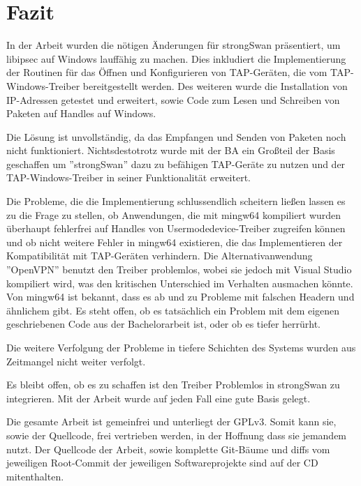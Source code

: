 



\section{Fazit}

In der Arbeit wurden die nötigen Änderungen für strongSwan präsentiert, um
libipsec auf Windows lauffähig zu machen. Dies inkludiert die Implementierung
der Routinen für das Öffnen und Konfigurieren von TAP-Geräten, die vom TAP-Windows-Treiber
bereitgestellt werden. Des weiteren wurde die Installation von IP-Adressen getestet
und erweitert, sowie Code zum Lesen und Schreiben von Paketen auf Handles auf Windows.

Die Lösung ist unvollständig, da das Empfangen und Senden von Paketen noch nicht funktioniert.
Nichtsdestotrotz wurde mit der \ac{BA} ein Großteil der Basis geschaffen um ''strongSwan''
dazu zu befähigen TAP-Geräte zu nutzen und der TAP-Windows-Treiber in seiner Funktionalität
erweitert.

Die Probleme, die die Implementierung schlussendlich scheitern ließen lassen es zu
die Frage zu stellen, ob Anwendungen, die mit mingw64 kompiliert wurden überhaupt
fehlerfrei auf Handles von Usermodedevice-Treiber zugreifen können und ob
nicht weitere Fehler in mingw64 existieren, die das Implementieren der Kompatibilität
mit TAP-Geräten verhindern. Die Alternativanwendung ''OpenVPN'' benutzt den
Treiber problemlos, wobei sie jedoch mit Visual Studio kompiliert wird,
was den kritischen Unterschied im Verhalten ausmachen könnte.
Von mingw64 ist bekannt, dass es ab und zu Probleme mit falschen Headern und ähnlichem
gibt. Es steht offen, ob es tatsächlich ein Problem mit dem eigenen geschriebenen Code
aus der Bachelorarbeit ist, oder ob es tiefer herrürht.

Die weitere Verfolgung der Probleme in tiefere Schichten des Systems wurden aus
Zeitmangel nicht weiter verfolgt.

Es bleibt offen, ob es zu schaffen ist den Treiber Problemlos in strongSwan zu integrieren.
Mit der Arbeit wurde auf jeden Fall eine gute Basis gelegt.

Die gesamte Arbeit ist gemeinfrei und unterliegt der GPLv3. Somit kann sie,
sowie der Quellcode, frei vertrieben werden, in der Hoffnung dass sie jemandem nutzt.
Der Quellcode der Arbeit, sowie komplette Git-Bäume und diffs vom jeweiligen Root-Commit
der jeweiligen Softwareprojekte sind auf der CD mitenthalten.

